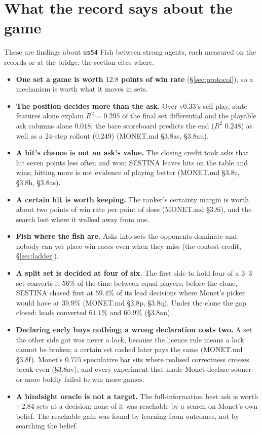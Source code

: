 \documentclass[11pt]{article}
\newcommand{\code}[1]{\texttt{#1}}
\newcommand{\usff}{\code{us54}}
\newcommand{\monet}{MONET.md}
\newcommand{\sect}[1]{\S#1}
\begin{document}
\section{What the record says about the game}
\label{sec:findings}

These are findings about \usff{} Fish between strong agents, each measured on the records or at the
bridge; the section cites where.

\begin{itemize}
  \item \textbf{One set a game is worth $12.8$ points of win rate} (\sect\ref{sec:protocol}), so a
        mechanism is worth what it moves in sets.
  \item \textbf{The position decides more than the ask.} Over v0.33's self-play, state features alone
        explain $R^2 = 0.295$ of the final set differential and the playable ask columns alone
        $0.018$; the bare scoreboard predicts the end ($R^2$ $0.248$) as well as a $24$-step rollout
        ($0.249$) (\monet{} \sect{3.8as}, \sect{3.8au}).
  \item \textbf{A hit's chance is not an ask's value.} The closing credit took asks that hit seven
        points less often and won; SESTINA leaves hits on the table and wins; hitting more is not
        evidence of playing better (\monet{} \sect{3.8c}, \sect{3.8h}, \sect{3.8as}).
  \item \textbf{A certain hit is worth keeping.} The ranker's certainty margin is worth about two
        points of win rate per point of dose (\monet{} \sect{3.8i}), and the search lost where it
        walked away from one.
  \item \textbf{Fish where the fish are.} Asks into sets the opponents dominate and nobody can yet
        place win races even when they miss (the contest credit, \sect\ref{sec:ladder}).
  \item \textbf{A split set is decided at four of six.} The first side to hold four of a 3--3 set
        converts it $56\%$ of the time between equal players; before the clone, SESTINA chased first at
        $59.4\%$ of its lead decisions where Monet's picker would have at $39.9\%$ (\monet{}
        \sect{3.8p}, \sect{3.8q}). Under the clone the gap closed: leads converted $61.1\%$ and $60.9\%$
        (\sect{3.8an}).
  \item \textbf{Declaring early buys nothing; a wrong declaration costs two.} A set the other side
        got was never a lock, because the licence rule means a lock cannot be broken; a certain set
        cashed later pays the same (\monet{} \sect{3.8f}). Monet's $0.775$ speculative bar sits where
        realised correctness crosses break-even (\sect{3.8av}), and every experiment that made Monet
        declare sooner or more boldly failed to win more games.
  \item \textbf{A hindsight oracle is not a target.} The full-information best ask is worth $+2.84$
        sets at a decision; none of it was reachable by a search on Monet's own belief. The reachable
        gain was found by learning from outcomes, not by searching the belief.
\end{itemize}
\end{document}

